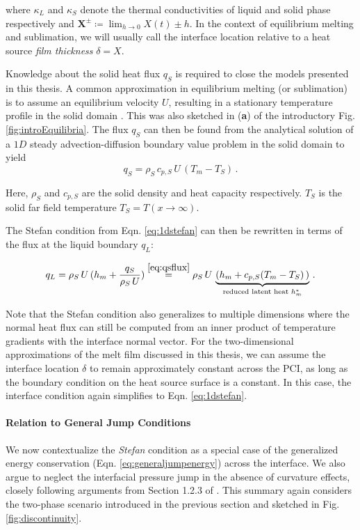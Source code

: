where $\kappa_L$ and $\kappa_S$ denote the thermal conductivities of liquid and solid phase respectively and  $\mathbf{X}^\pm \coloneqq \lim_{h\to 0}X(t)\pm h$. In the context of equilibrium melting and sublimation, we will usually call the interface location relative to a heat source \textit{film thickness} $\delta = X$. 

Knowledge about the solid heat flux $q_S$ is required to close the models presented in this thesis. A common approximation in equilibrium melting (or sublimation) is to assume an equilibrium velocity $U$, resulting in a stationary temperature profile in the solid domain \cite{schuller2017spatially}. This was also sketched in (\textbf{a}) of the introductory Fig. \ref{fig:introEquilibria}. The flux $q_S$ can then be found from the analytical solution of a $1D$ steady advection-diffusion boundary value problem in the solid domain to yield
\begin{equation}\label{eq:qsflux}
    q_{S}=\rho_S \,c_{p,S}\, U\,(T_m-T_S)\,.
\end{equation}

Here, $\rho_S$ and $c_{p,S}$ are the solid density and heat capacity respectively. $T_S$ is the solid far field temperature $T_S= T(x\to\infty)$.

The Stefan condition from Eqn. \ref{eq:1dstefan} can then be rewritten in terms of the flux at the liquid boundary $q_L$:

\begin{equation}\label{eq:qlequilibrium}
    q_L = \rho_S \, U\,(h_m + \frac{q_S}{\rho_S\,U}) \overset{\ref{eq:qsflux}}{=} \rho_S \, U\,\underbrace{(h_m + c_{p,S}(T_m-T_S)\,)}_{\text{reduced latent heat }h_m^*}\,.
\end{equation}

Note that the Stefan condition also generalizes to multiple dimensions where the normal heat flux can still be computed from an inner product of temperature gradients with the interface normal vector. For the two-dimensional approximations of the melt film discussed in this thesis, we can assume the interface location $\delta$ to remain approximately constant across the \gls{PCI}, as long as the boundary condition on the heat source surface is a constant. In this case, the interface condition again simplifies to Eqn. \ref{eq:1dstefan}.

\paragraph{Relation to General Jump Conditions}
 We now contextualize the \textit{Stefan} condition as a special case of the generalized energy conservation (Eqn. \ref{eq:generaljumpenergy}) across the interface. We also argue to neglect the interfacial pressure jump in the absence of curvature effects, closely following arguments from Section 1.2.3 of \cite{ishii2010thermo}. This summary again considers the two-phase scenario introduced in the previous section and sketched in Fig. \ref{fig:discontinuity}. 

